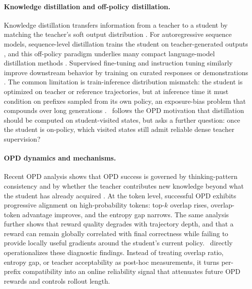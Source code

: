 \paragraph{Knowledge distillation and off-policy distillation.}
Knowledge distillation transfers information from a teacher to a student by matching the teacher's soft output distribution \citep{hinton2015distilling}.
For autoregressive sequence models, sequence-level distillation trains the student on teacher-generated outputs \citep{kim2016sequence}, and this off-policy paradigm underlies many compact language-model distillation methods \citep{sanh2019distilbert,jiao2020tinybert,wang2020minilm,gu2026coevolvingpolicydistillation}.
Supervised fine-tuning and instruction tuning similarly improve downstream behavior by training on curated responses or demonstrations \citep{chung2024scaling,sanh2021multitask,wei2021finetuned}.
The common limitation is train-inference distribution mismatch: the student is optimized on teacher or reference trajectories, but at inference time it must condition on prefixes sampled from its own policy, an exposure-bias problem that compounds over long generations \citep{bengio2015scheduled}.
\method~follows the OPD motivation that distillation should be computed on student-visited states, but asks a further question: once the student is on-policy, which visited states still admit reliable dense teacher supervision?

\paragraph{OPD dynamics and mechanisms.}
Recent OPD analysis shows that OPD success is governed by thinking-pattern consistency and by whether the teacher contributes new knowledge beyond what the student has already acquired \citep{li2026rethinking}.
At the token level, successful OPD exhibits progressive alignment on high-probability tokens: top-$k$ overlap rises, overlap-token advantage improves, and the entropy gap narrows.
The same analysis further shows that reward quality degrades with trajectory depth, and that a reward can remain globally correlated with final correctness while failing to provide locally useful gradients around the student's current policy.
\method~directly operationalizes these diagnostic findings.
Instead of treating overlap ratio, entropy gap, or teacher acceptability as post-hoc measurements, it turns per-prefix compatibility into an online reliability signal that attenuates future OPD rewards and controls rollout length.


